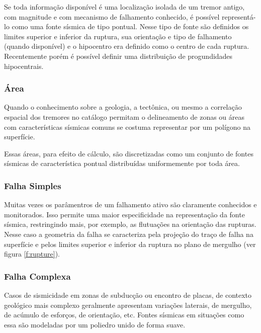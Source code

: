 Se toda informação disponível é uma localização isolada de um tremor antigo, com magnitude e com mecanismo de
falhamento conhecido, é possível representá-lo como uma fonte sísmica de tipo pontual.
Nesse tipo de fonte são definidos os limites superior e inferior da ruptura,
sua orientação e tipo de falhamento (quando disponível)
e o hipocentro era definido como o centro de cada ruptura. Recentemente porém é possível definir uma distribuição de
progundidades hipocentrais.

\subsubsection{Área}
\label{sec:area_source}

Quando o conhecimento sobre a geologia, a tectônica, ou mesmo a correlação espacial dos tremores no catálogo permitam
o delineamento de zonas ou áreas com características sísmicas comuns se costuma representar por um polígono na
superfície.

Essas áreas, para efeito de cálculo, são discretizadas como um conjunto de fontes sísmicas de
característica pontual distribuídas uniformemente por toda área.

\subsubsection{Falha Simples}
\label{sec:simple_fault_source}

Muitas vezes os parâmentros de um falhamento ativo são claramente conhecidos e monitorados. Isso permite uma maior
especificidade na representação da fonte sísmica, restringindo mais, por exemplo, as flutuações na orientação das
rupturas.
Nesse caso a geometria da falha se caracteriza pela projeção do traço de falha na superfície e pelos limites superior e
inferior da ruptura no plano de mergulho (ver figura \ref{f:rupture}).


\subsubsection{Falha Complexa}
\label{sec:complex_fault_source}

Casos de sismicidade em zonas de subducção ou encontro de placas, de contexto geológico mais complexo
geralmente apresentam variações laterais, de mergulho, de acúmulo de esforços, de orientação, etc. Fontes sísmicas em
situações como essa são modeladas por um poliedro unido de forma suave.


